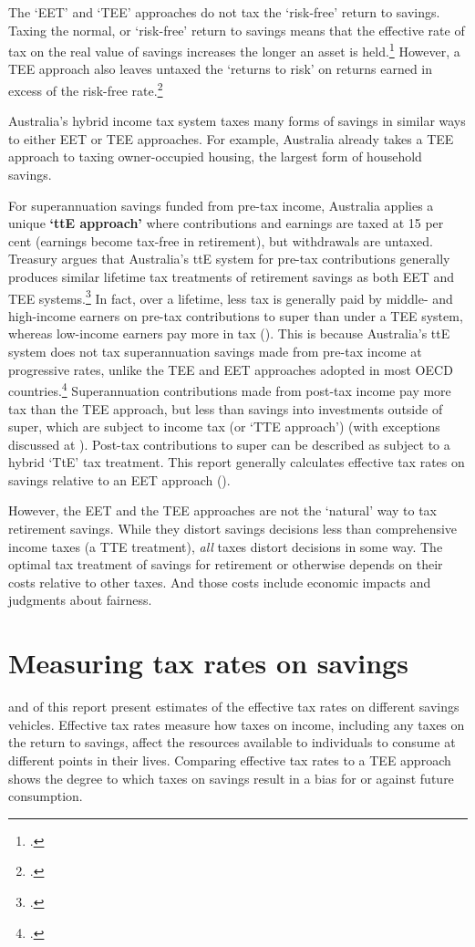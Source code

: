\documentclass{grattanAlpha}
\begin{document}
The ‘EET’ and ‘TEE’ approaches do not tax the ‘risk-free’ return to savings. Taxing the normal, or ‘risk-free’ return to savings means that the effective rate of tax on the real value of savings increases the longer an asset is held.\footcite[][297]{MirrleesAdamBesleyEtAl2011}  However, a TEE approach also leaves untaxed the ‘returns to risk’ on returns earned in excess of the risk-free rate.\footcite[][16]{Ingles2015}

Australia’s hybrid income tax system taxes many forms of savings in similar ways to either EET or TEE approaches. For example, Australia already takes a TEE approach to taxing owner-occupied housing, the largest form of household savings.

For superannuation savings funded from pre-tax income, Australia applies a unique \textbf{‘ttE approach’} where contributions and earnings are taxed at 15 per cent (earnings become tax-free in retirement), but withdrawals are untaxed. Treasury argues that Australia’s ttE system for pre-tax contributions generally produces similar lifetime tax treatments of retirement savings as both EET and TEE systems.\footcite[][97]{HenryTaxReview2010}  In fact, over a lifetime, less tax is generally paid by middle- and high-income earners on pre-tax contributions to super than under a TEE system, whereas low-income earners pay more in tax (). This is because Australia’s ttE system does not tax superannuation savings made from pre-tax income at progressive rates, unlike the TEE and EET approaches adopted in most OECD countries.\footcite[][7]{Mercer2013a} 
Superannuation contributions made from post-tax income pay more tax than the TEE approach, but less than savings into investments outside of super, which are subject to income tax (or ‘TTE approach’) (with exceptions discussed at ). Post-tax contributions to super can be described as subject to a hybrid ‘TtE’ tax treatment. This report generally calculates effective tax rates on savings relative to an EET approach ().

However, the EET and the TEE approaches are not the ‘natural’ way to tax retirement savings. While they distort savings decisions less than comprehensive income taxes (a TTE treatment), \emph{all} taxes distort decisions in some way. The optimal tax treatment of savings for retirement or otherwise depends on their costs relative to other taxes. And those costs include economic impacts and judgments about fairness.

\section{Measuring tax rates on savings}\label{appendix:SUPER-C-2}
 and  of this report present estimates of the effective tax rates on different savings vehicles. Effective tax rates measure how taxes on income, including any taxes on the return to savings, affect the resources available to individuals to consume at different points in their lives. Comparing effective tax rates to a TEE approach shows the degree to which taxes on savings result in a bias for or against future consumption.
\end{document}
